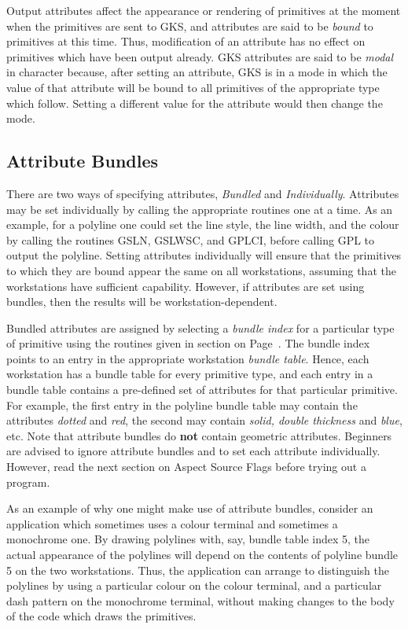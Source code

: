 Output attributes affect the appearance or rendering of primitives at the
moment when the primitives are sent to GKS, and attributes are said to be
{\it bound} to primitives at this time.
Thus, modification of an attribute has no effect on primitives which
have been output already.
GKS attributes are said to be {\it modal} in character because,
after setting an attribute, GKS is in a mode in which the value of that
attribute will be bound to all primitives of the appropriate type which
follow. Setting a different value for the attribute would then
change the mode.
\subsection{Attribute Bundles}
 
There are two ways of specifying attributes,
{\it Bundled} and {\it Individually}.
Attributes may be set individually by calling the appropriate routines
one at a time. As an example, for a polyline one could set the
line style, the line width, and the colour by calling the routines
GSLN, GSLWSC, and GPLCI, before calling GPL to output the polyline.
Setting attributes individually will ensure that
the primitives to which they are bound appear the same on all
workstations, assuming that the workstations have sufficient capability.
However, if attributes are set using bundles, then the results will
be workstation-dependent.
 
Bundled attributes are assigned by selecting a {\it bundle index}
for a particular type of primitive using the routines given in section
on Page~\pageref{sec:setbnd}. The bundle index points to an entry in the
appropriate workstation {\it bundle table}.
Hence, each workstation has a bundle table for every primitive type,
and each entry in a bundle table contains a pre-defined set of
attributes for that particular primitive.
For example, the first entry in the polyline bundle table may contain
the attributes {\it dotted} and {\it red}, the second may
contain {\it solid, double thickness} and {\it blue}, etc.
Note that attribute bundles do
{\bf not} contain geometric attributes.
Beginners are advised to ignore attribute bundles and to set each
attribute individually. However, read the next section on
Aspect Source Flags before trying out a program.
 
As an example of why one might make use of attribute bundles,
consider an application which sometimes uses a colour terminal and
sometimes a monochrome one.
By drawing polylines with, say, bundle table index 5, the actual
appearance of the polylines will depend on the contents of
polyline bundle 5 on the two workstations. Thus, the application
can arrange to distinguish the polylines by using a particular
colour on the colour terminal, and a particular dash pattern
on the monochrome terminal, without making changes to the body of the
code which draws the primitives.
 
